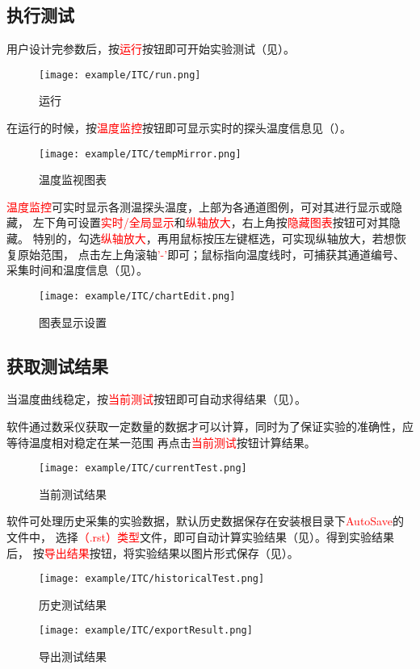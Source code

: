 \subsection{执行测试}
用户设计完参数后，按\textcolor{red}{运行}按钮即可开始实验测试（见）。
\begin{figure}[H]
	\centering
	\texttt{[image: example/ITC/run.png]}
	\caption{ 运行 \label{fig:exmp_itc_run}}
\end{figure}
在运行的时候，按\textcolor{red}{温度监控}按钮即可显示实时的探头温度信息见（）。
\begin{figure}[H]
	\centering
	\texttt{[image: example/ITC/tempMirror.png]}
	\caption{ 温度监视图表 \label{fig:exmp_itc_tempMirror}}
\end{figure}
\textcolor{red}{温度监控}可实时显示各测温探头温度，上部为各通道图例，可对其进行显示或隐藏，
左下角可设置\textcolor{red}{实时/全局显示}和\textcolor{red}{纵轴放大}，右上角按\textcolor{red}{隐藏图表}按钮可对其隐藏。
特别的，勾选\textcolor{red}{纵轴放大}，再用鼠标按压左键框选，可实现纵轴放大，若想恢复原始范围，
点击左上角滚轴\textcolor{red}{'-'}即可；鼠标指向温度线时，可捕获其通道编号、采集时间和温度信息（见）。\\
\begin{figure}[H]
	\centering
	\texttt{[image: example/ITC/chartEdit.png]}
	\caption{ 图表显示设置 \label{fig:exmp_itc_chartEdit}}
\end{figure}

\subsection{获取测试结果}
	当温度曲线稳定，按\textcolor{red}{当前测试}按钮即可自动求得结果（见）。
\begin{note}
	软件通过数采仪获取一定数量的数据才可以计算，同时为了保证实验的准确性，应等待温度相对稳定在某一范围
再点击\textcolor{red}{当前测试}按钮计算结果。
\end{note}
\begin{figure}[H]
	\centering
	\texttt{[image: example/ITC/currentTest.png]}
	\caption{ 当前测试结果 \label{fig:exmp_itc_currentTest}}
\end{figure}
软件可处理历史采集的实验数据，默认历史数据保存在安装根目录下\textcolor{red}{AutoSave}的文件中，
选择\textcolor{red}{（.rst）类型}文件，即可自动计算实验结果（见）。得到实验结果后，
按\textcolor{red}{导出结果}按钮，将实验结果以图片形式保存（见）。
\begin{figure}[H]
	\centering
	\texttt{[image: example/ITC/historicalTest.png]}
	\caption{ 历史测试结果 \label{fig:exmp_itc_historicalTest}}
\end{figure}

\begin{figure}[H]
	\centering
	\texttt{[image: example/ITC/exportResult.png]}
	\caption{ 导出测试结果 \label{fig:exmp_itc_exportResult}}
\end{figure}